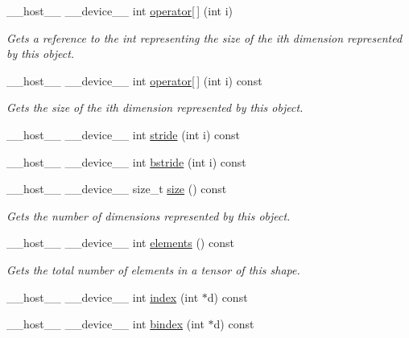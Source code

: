 \begin{DoxyCompactItemize}
\+\_\+\+\_\+host\+\_\+\+\_\+ \+\_\+\+\_\+device\+\_\+\+\_\+ int \hyperlink{structmarian_1_1ShapeGPU_aa055cb9851f538831c1ffdd6b7b9f06a}{operator\mbox{[}$\,$\mbox{]}} (int i)
\begin{DoxyCompactList}\small\item\em Gets a reference to the int representing the size of the {\ttfamily i}th dimension represented by this object. \end{DoxyCompactList}\item 
\+\_\+\+\_\+host\+\_\+\+\_\+ \+\_\+\+\_\+device\+\_\+\+\_\+ int \hyperlink{structmarian_1_1ShapeGPU_a4f9dc2d347c1c665d7988dc9b931299b}{operator\mbox{[}$\,$\mbox{]}} (int i) const 
\begin{DoxyCompactList}\small\item\em Gets the size of the {\ttfamily i}th dimension represented by this object. \end{DoxyCompactList}\item 
\+\_\+\+\_\+host\+\_\+\+\_\+ \+\_\+\+\_\+device\+\_\+\+\_\+ int \hyperlink{structmarian_1_1ShapeGPU_a411087bfb2a81997c34fc70d16915b72}{stride} (int i) const 
\item 
\+\_\+\+\_\+host\+\_\+\+\_\+ \+\_\+\+\_\+device\+\_\+\+\_\+ int \hyperlink{structmarian_1_1ShapeGPU_a654ae2347fb721431816e338b1f55292}{bstride} (int i) const 
\item 
\+\_\+\+\_\+host\+\_\+\+\_\+ \+\_\+\+\_\+device\+\_\+\+\_\+ size\+\_\+t \hyperlink{structmarian_1_1ShapeGPU_aa9f763893bf9869c8d1e185fd8ffd46f}{size} () const 
\begin{DoxyCompactList}\small\item\em Gets the number of dimensions represented by this object. \end{DoxyCompactList}\item 
\+\_\+\+\_\+host\+\_\+\+\_\+ \+\_\+\+\_\+device\+\_\+\+\_\+ int \hyperlink{structmarian_1_1ShapeGPU_a4af583e3ce361798a8b84c4f0a058e5d}{elements} () const 
\begin{DoxyCompactList}\small\item\em Gets the total number of elements in a tensor of this shape. \end{DoxyCompactList}\item 
\+\_\+\+\_\+host\+\_\+\+\_\+ \+\_\+\+\_\+device\+\_\+\+\_\+ int \hyperlink{structmarian_1_1ShapeGPU_ab7d93ef443405d53f34cd2d41c25fd37}{index} (int $\ast$d) const 
\item 
\+\_\+\+\_\+host\+\_\+\+\_\+ \+\_\+\+\_\+device\+\_\+\+\_\+ int \hyperlink{structmarian_1_1ShapeGPU_abba723039045f88819630d71dc448744}{bindex} (int $\ast$d) const 

\end{DoxyCompactItemize}
